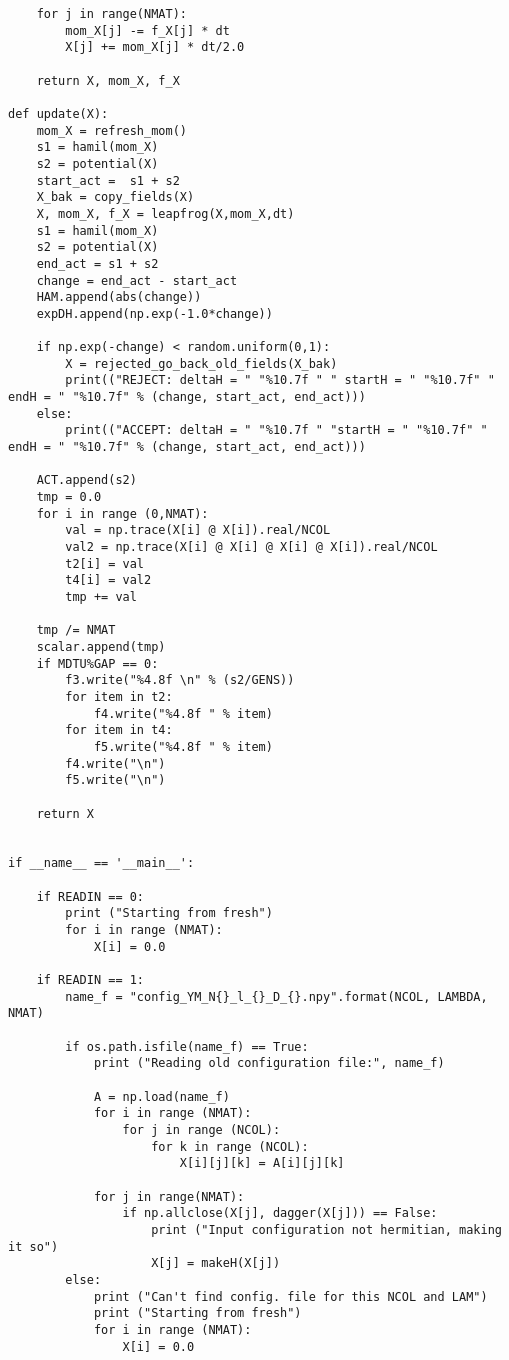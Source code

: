 \begin{lstlisting}
    for j in range(NMAT):
        mom_X[j] -= f_X[j] * dt
        X[j] += mom_X[j] * dt/2.0
    
    return X, mom_X, f_X

def update(X):
    mom_X = refresh_mom()
    s1 = hamil(mom_X)
    s2 = potential(X)
    start_act =  s1 + s2
    X_bak = copy_fields(X) 
    X, mom_X, f_X = leapfrog(X,mom_X,dt)
    s1 = hamil(mom_X)
    s2 = potential(X)
    end_act = s1 + s2
    change = end_act - start_act
    HAM.append(abs(change))
    expDH.append(np.exp(-1.0*change))   

    if np.exp(-change) < random.uniform(0,1):
        X = rejected_go_back_old_fields(X_bak)
        print(("REJECT: deltaH = " "%10.7f " " startH = " "%10.7f" " endH = " "%10.7f" % (change, start_act, end_act)))
    else:
        print(("ACCEPT: deltaH = " "%10.7f " "startH = " "%10.7f" " endH = " "%10.7f" % (change, start_act, end_act)))

    ACT.append(s2)
    tmp = 0.0 
    for i in range (0,NMAT):
        val = np.trace(X[i] @ X[i]).real/NCOL
        val2 = np.trace(X[i] @ X[i] @ X[i] @ X[i]).real/NCOL
        t2[i] = val 
        t4[i] = val2 
        tmp += val 

    tmp /= NMAT 
    scalar.append(tmp) 
    if MDTU%GAP == 0:
        f3.write("%4.8f \n" % (s2/GENS))
        for item in t2:
            f4.write("%4.8f " % item)
        for item in t4:
            f5.write("%4.8f " % item)
        f4.write("\n")
        f5.write("\n") 

    return X


if __name__ == '__main__':

    if READIN == 0:
        print ("Starting from fresh")
        for i in range (NMAT):  
            X[i] = 0.0  

    if READIN == 1:
        name_f = "config_YM_N{}_l_{}_D_{}.npy".format(NCOL, LAMBDA, NMAT)

        if os.path.isfile(name_f) == True: 
            print ("Reading old configuration file:", name_f)
            
            A = np.load(name_f)
            for i in range (NMAT):
                for j in range (NCOL):
                    for k in range (NCOL):
                        X[i][j][k] = A[i][j][k] 

            for j in range(NMAT):
                if np.allclose(X[j], dagger(X[j])) == False:
                    print ("Input configuration not hermitian, making it so")
                    X[j] = makeH(X[j])
        else: 
            print ("Can't find config. file for this NCOL and LAM")
            print ("Starting from fresh")
            for i in range (NMAT):  
                X[i] = 0.0


\end{lstlisting}
